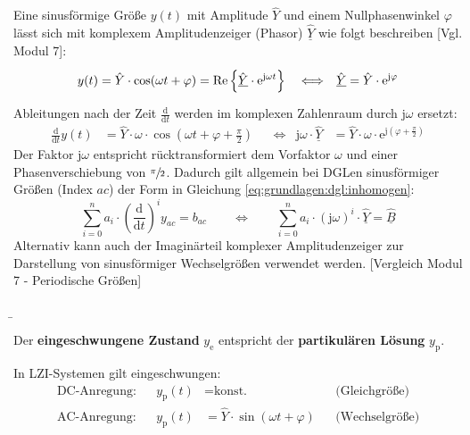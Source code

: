 \begin{frame}
{    Eine sinusförmige Größe $y(t)$ mit Amplitude $\hat{Y}$ und einem Nullphasenwinkel $\varphi$ lässt sich mit komplexem Amplitudenzeiger (Phasor) $\underline{\hat{Y}}$ 
    wie folgt beschreiben [Vgl. Modul 7]:
    \begin{align*}
        y(t) &= \hat{Y} \cdot \cos(\omega t + \varphi) = \Re\left\{ \underline{\hat{Y}} \cdot \mathrm{e}^{\mathrm{j} \omega t} \right\} &
            &\Longleftrightarrow& 
            \underline{\hat{Y}} &= \hat{Y} \cdot \mathrm{e}^{\mathrm{j} \varphi} 
            \vphantom{\bigg|}\\
    \end{align*}
    Ableitungen nach der Zeit $\frac{\mathrm{d}}{\mathrm{d}t}$ werden im komplexen Zahlenraum durch $\mathrm{j} \omega$ ersetzt:
    \begin{align*}
        \frac{\mathrm{d}}{\mathrm{d}t} y(t) &= \hat{Y} \cdot \omega \cdot \cos(\omega t + \varphi + \frac{\pi}{2}) &
            &\Longleftrightarrow& 
            \mathrm{j} \omega \cdot  \underline{\hat{Y}} &= \hat{Y} \cdot \omega \cdot \mathrm{e}^{\mathrm{j} \left(\varphi + \frac{\pi}{2}\right)}
    \end{align*}
    Der Faktor $\mathrm{j}\omega$ entspricht rücktransformiert dem Vorfaktor $\omega$ und einer Phasenverschiebung von $\sfrac{\pi}{2}$. 
    Dadurch gilt allgemein bei DGLen sinusförmiger Größen (Index $ac$) der Form in Gleichung \ref{eq:grundlagen:dgl:inhomogen}: 
    \begin{equation}
        \sum_{i=0}^n a_i \cdot \left(\frac{\mathrm{d}}{\mathrm{d}t}\right)^i y_{ac} = b_{ac}
        \qquad \Longleftrightarrow \qquad 
        \sum_{i=0}^n a_i \cdot \left(\mathrm{j}\omega\right)^i \cdot \underline{\hat{Y}} = \underline{\hat{B}}
        \label{eq:grundlagen:dgl:komplex}
    \end{equation}
    Alternativ kann auch der Imaginärteil komplexer Amplitudenzeiger zur Darstellung von sinusförmiger Wechselgrößen verwendet werden. 
    [Vergleich Modul 7 - Periodische Größen]

}%
\b{%
    Der \textbf{eingeschwungene Zustand} $y_{\mathrm{e}}$ entspricht der \textbf{partikulären Lösung} $y_{\mathrm{p}}$.
    \vspace{2mm}

    In LZI-Systemen gilt eingeschwungen:
    \begin{align*}
        \text{DC-Anregung:} && y_{\mathrm{p}}(t) &= \text{konst.} &&\text{(Gleichgröße)}\\
        \text{AC-Anregung:} && y_{\mathrm{p}}(t) &= \hat{Y} \cdot \sin(\omega t + \varphi) &&\text{(Wechselgröße)}
    \end{align*}

}
\end{frame}
